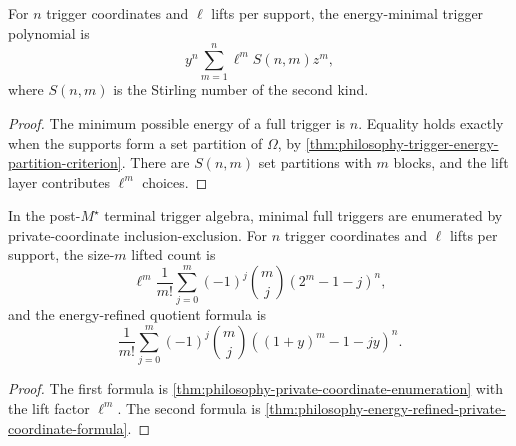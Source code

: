 \begin{corollary}
\label{cor:philosophy-private-coordinate-energy-minimal-partitions}
For $n$ trigger coordinates and $\ell$ lifts per support, the
energy-minimal trigger polynomial is
$$
  y^{n}\sum_{m=1}^{n}\ell^{m}S(n,m)z^{m},
$$
where $S(n,m)$ is the Stirling number of the second kind.
\end{corollary}
\begin{proof}
The minimum possible energy of a full trigger is $n$. Equality holds
exactly when the supports form a set partition of $\Omega$, by
\autoref{thm:philosophy-trigger-energy-partition-criterion}. There are
$S(n,m)$ set partitions with $m$ blocks, and the lift layer contributes
$\ell^{m}$ choices.
\end{proof}

\begin{theorem}
\label{thm:philosophy-private-coordinate-trigger-enumeration-theorem}
In the post-$M^{\star}$ terminal trigger algebra, minimal full triggers
are enumerated by private-coordinate inclusion-exclusion. For $n$
trigger coordinates and $\ell$ lifts per support, the size-$m$ lifted
count is
$$
  \ell^{m}
  \frac{1}{m!}
  \sum_{j=0}^{m}
  (-1)^{j}
  \binom{m}{j}
  (2^{m}-1-j)^{n},
$$
and the energy-refined quotient formula is
$$
  \frac{1}{m!}
  \sum_{j=0}^{m}
  (-1)^{j}
  \binom{m}{j}
  \left((1+y)^{m}-1-jy\right)^{n}.
$$
\end{theorem}
\begin{proof}
The first formula is \autoref{thm:philosophy-private-coordinate-enumeration}
with the lift factor $\ell^{m}$. The second formula is
\autoref{thm:philosophy-energy-refined-private-coordinate-formula}.
\end{proof}

